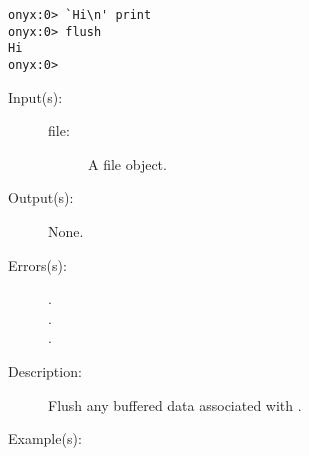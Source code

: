 \begin{description}
\begin{description}
\begin{verbatim}
onyx:0> `Hi\n' print
onyx:0> flush
Hi
onyx:0>
		\end{verbatim}
	\end{description}
\label{systemdict:flushfile}
\item[{\onyxop{file}{flushfile}{--}}: ]
	\begin{description}\item[]
	\item[Input(s): ]
		\begin{description}\item[]
		\item[file: ]
			A file object.
		\end{description}
	\item[Output(s): ] None.
	\item[Errors(s): ]
		\begin{description}\item[]
		\item[.]
		\item[.]
		\item[.]
		\end{description}
	\item[Description: ]
		Flush any buffered data associated with .
	\item[Example(s): ]\begin{verbatim}


\end{verbatim}
\end{description}
\end{description}
